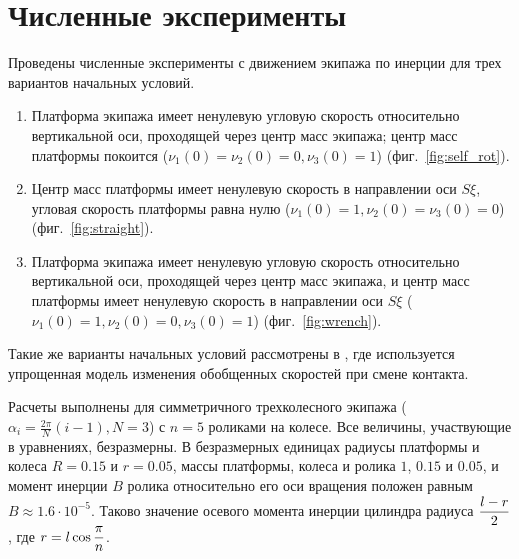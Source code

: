 
\section{Численные эксперименты}

Проведены численные эксперименты с движением экипажа по инерции для трех вариантов начальных условий.
\begin{enumerate}[wide]
    \item \label{sol:self_rot} Платформа экипажа имеет ненулевую угловую скорость относительно вертикальной оси, проходящей через центр масс экипажа; центр масс платформы покоится ($\nu_1(0) = \nu_2(0) = 0, \nu_3(0) = 1$) (фиг.~\ref{fig:self_rot}).
    \item \label{sol:straight} Центр масс платформы имеет ненулевую скорость в направлении оси $S\xi$, угловая скорость платформы равна нулю ($\nu_1(0) = 1, \nu_2(0) = \nu_3(0) = 0$) (фиг.~\ref{fig:straight}).
    \item \label{sol:wrench} Платформа экипажа имеет ненулевую угловую скорость относительно вертикальной оси, проходящей через центр масс экипажа, и центр масс платформы имеет ненулевую скорость в направлении оси $S\xi$ ($\nu_1(0) = 1, \nu_2(0) = 0, \nu_3(0) = 1$) (фиг.~\ref{fig:wrench}).
\end{enumerate}
Такие же варианты начальных условий рассмотрены в \cite{GerasimovZobovaPMM2018}, где используется упрощенная модель изменения обобщенных скоростей при смене контакта.

Расчеты выполнены для симметричного трехколесного экипажа ($\alpha_i = \frac{2\pi}{N}(i - 1), N = 3$) с $n = 5$ роликами на колесе. Все величины, участвующие в уравнениях, безразмерны. В безразмерных единицах радиусы платформы и колеса $R = 0.15$ и $r = 0.05$, массы платформы, колеса и ролика $1$, $0.15$ и $0.05$, и момент инерции $B$ ролика относительно его оси вращения положен равным $B \approx 1.6 \cdot 10^{-5}$. Таково значение осевого момента инерции цилиндра радиуса $\displaystyle\frac{\displaystyle l-r}{\displaystyle 2}$, где $r = l\cos\displaystyle\frac{\displaystyle \pi}{\displaystyle n}$.

